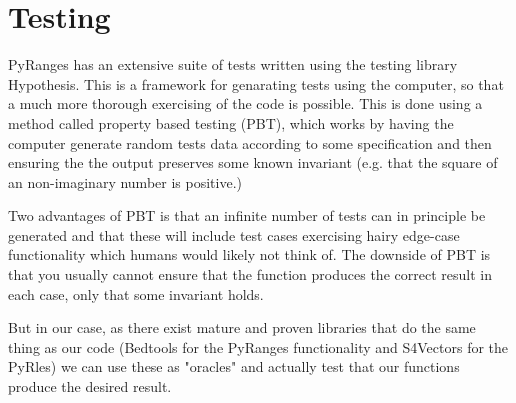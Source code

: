 \documentclass[10pt,letterpaper]{article}
\begin{document}


\section*{Testing}

PyRanges has an extensive suite of tests written using the testing library
Hypothesis. This is a framework for genarating tests using the computer, so that
a much more thorough exercising of the code is possible. This is done using a
method called property based testing (PBT), which works by having the computer
generate random tests data according to some specification and then ensuring the
the output preserves some known invariant (e.g. that the square of an
non-imaginary number is positive.)

Two advantages of PBT is that an infinite number of tests can in principle be
generated and that these will include test cases exercising hairy edge-case
functionality which humans would likely not think of. The downside of PBT is
that you usually cannot ensure that the function produces the correct result in
each case, only that some invariant holds.

But in our case, as there exist mature and proven libraries that do the same
thing as our code (Bedtools for the PyRanges functionality and S4Vectors for the
PyRles) we can use these as "oracles" and actually test that our functions
produce the desired result.
\end{document}
